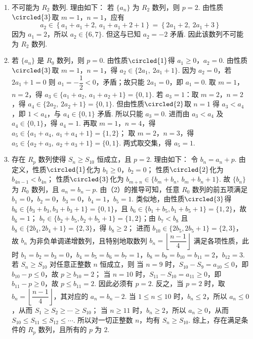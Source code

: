 \begin{solution}
\begin{enumerate}
    \item 不可能为 \(R_2\) 数列. 理由如下：
若 \(\{a_n\}\) 为 \(R_2\) 数列，则 \(p=2\).
由性质\(\circled{3}\)取 \(m=1\)，\(n=1\)，应有
\[
a_2\in\left\{a_1+a_1+2,\ a_1+a_1+2+1\right\}=\left\{2a_1+2,\ 2a_1+3\right\}
\]
因为 \(a_1=2\)，所以 \(a_2\in\{6,7\}\).
但这与已知 \(a_2=-2\) 矛盾.
因此该数列不可能为 \(R_2\) 数列.
    \item 若 \(\{a_n\}\) 是 \(R_0\) 数列，则 \(p=0\).
由性质\(\circled{1}\)得 \(a_1\ge0\)，\(a_2=0\).
由性质\(\circled{3}\)取 \(m=1\)，\(n=1\)，得 \(a_2\in\{2a_1,\ 2a_1+1\}\).
因为 \(a_2=0\)，若 \(2a_1+1=0\) 则 \(a_1=-\dfrac12<0\)，矛盾；故只能 \(2a_1=0\)，即 \(a_1=0\).
取 \(m=1\)，\(n=2\)，得 \(a_3\in\{a_1+a_2,\ a_1+a_2+1\}=\{0,1\}\).
若 \(a_3=1\)：取 \(m=2\)，\(n=2\)，得 \(a_4\in\{2a_2,\ 2a_2+1\}=\{0,1\}\).
但由性质\(\circled{2}\)取 \(n=1\) 得 \(a_3<a_4\)，即 \(1<a_4\)，与 \(a_4\in\{0,1\}\) 矛盾.
所以只能 \(a_3=0\).
进而由 \(a_3<a_4\) 及 \(a_4\in\{0,1\}\)，得 \(a_4=1\).
再取 \(m=1\)，\(n=4\)，得 \(a_5\in\{a_1+a_4,\ a_1+a_4+1\}=\{1,2\}\)；
取 \(m=2\)，\(n=3\)，得 \(a_5\in\{a_2+a_3,\ a_2+a_3+1\}=\{0,1\}\).
两式取交集，得 \(a_5=1\).
    \item 存在 \(R_p\) 数列使得 \(S_n\ge S_{10}\) 恒成立，且 \(p=2\). 理由如下：
令 \(b_n=a_n+p\). 由定义，性质\(\circled{1}\)化为 \(b_1\ge0\)，\(b_2=0\)；
性质\(\circled{2}\)化为 \(b_{4n-1}<b_{4n}\)；
性质\(\circled{3}\)化为 \(b_{m+n}\in\{b_m+b_n,\ b_m+b_n+1\}\).
故 \(\{b_n\}\) 为 \(R_0\) 数列，且 \(a_n=b_n-p\).
由（2）的推导可知，任意 \(R_0\) 数列的前五项满足 \(b_1=0\)，\(b_2=0\)，\(b_3=0\)，\(b_4=1\)，\(b_5=1\).
类似地，由性质\(\circled{3}\)得
\(b_6\in\{b_3+b_3,b_3+b_3+1\}=\{0,1\}\)，且 \(b_6\in\{b_1+b_5,b_1+b_5+1\}=\{1,2\}\)，故 \(b_6=1\)；
\(b_7\in\{b_2+b_5,b_2+b_5+1\}=\{1,2\}\)；由 \(b_7<b_8\) 且 \(b_8\in\{2b_4,2b_4+1\}=\{2,3\}\)，得 \(b_8\ge2\)；
进而 \(b_{10}\in\{2b_5,2b_5+1\}=\{2,3\}\)，故 \(b_n\) 为非负单调递增数列，且特别地取数列 \(b_n=\left\lfloor\dfrac{n-1}{4}\right\rfloor\) 满足各项性质，此时 \(b_1=b_2=b_3=0\)，\(b_4=b_5=b_6=b_7=1\)，\(b_8=b_9=b_{10}=b_{11}=2\)，\(b_{12}=3\).
若 \(S_n\ge S_{10}\) 对任意正整数 \(n\) 恒成立，则
当 \(n=9\) 时，\(S_{10}-S_9=a_{10}\le0\)，即 \(b_{10}-p\le0\)，故 \(p\ge b_{10}=2\)；
当 \(n=10\) 时，\(S_{11}-S_{10}=a_{11}\ge0\)，即 \(b_{11}-p\ge0\)，故 \(p\le b_{11}=2\).
因此必须有 \(p=2\).
反之，当 \(p=2\) 时，取 \(b_n=\left\lfloor\dfrac{n-1}{4}\right\rfloor\)，其对应的 \(a_n=b_n-2\).
当 \(1\le n\le 10\) 时，\(b_n\le 2\)，所以 \(a_n\le 0\)，从而 \(S_1\ge S_2\ge\cdots\ge S_{10}\)；
当 \(n\ge 11\) 时，\(b_n\ge 2\)，所以 \(a_n\ge 0\)，从而 \(S_{10}\le S_{11}\le S_{12}\le\cdots\).
所以对一切正整数 \(n\)，均有 \(S_n\ge S_{10}\).
综上，存在满足条件的 \(R_p\) 数列，且所有的 \(p\) 为 \(2\).
\end{enumerate}
\end{solution}
